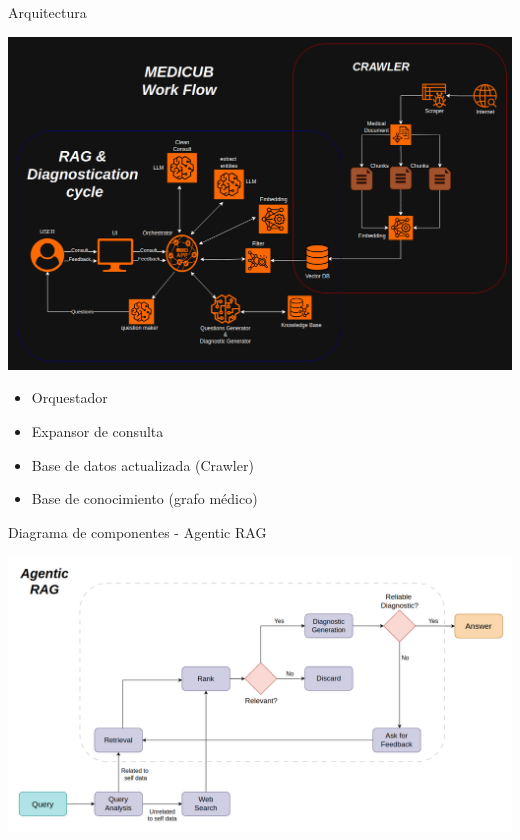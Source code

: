 \documentclass[10pt]{beamer}
\begin{document}
\begin{frame}{Arquitectura}
  \begin{center}
    \includegraphics[scale=0.18]{Work Flow.png}
  \end{center}
  
  \begin{itemize}
    \item Orquestador
    \item Expansor de consulta
    \item Base de datos actualizada (Crawler)  
    \item Base de conocimiento (grafo médico)
  \end{itemize}

\end{frame}

\begin{frame}{Diagrama de componentes - Agentic RAG}
  \begin{center}
    \includegraphics[scale=0.25]{Agentic_RAG.png}
  \end{center}  
\end{frame}
\end{document}
